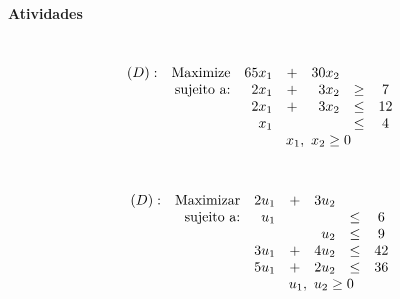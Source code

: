 \documentclass[12pt]{exam}
\begin{document}



\printanswers

\begin{center}
\textbf{{\Huge Atividades}}
\end{center}

\begin{questions}

\question \ \\


	\begin{equation*}	
				\begin{array}{c r r c r c c }
			(D) :&  \text{Maximize}   & 65x_1 & +  & 30x_2 \\
			& \text{sujeito a:} & 2x_1 & + & 3x_2  & \geq & 7 \\
			&                   & 2x_1 & + & 3x_2  & \leq & 12 \\
			&                   &  x_1 &   &       & \leq & 4 \\
			&                   & \multicolumn{5}{c}{x_1,~x_2 \geq 0}
			\end{array}
	\end{equation*}

\question \ \\
	\begin{equation*}	
				\begin{array}{c r r c r c c }
			(D) :&  \text{Maximizar}   & 2u_1 & +  & 3u_2 \\
			& \text{sujeito a:} & u_1   &    &           & \leq   & 6 \\
			&                           &          &    & u_2    & \leq   & 9 \\
			&                           & 3u_1 & + & 4u_2  & \leq  & 42 \\
			&                           & 5u_1 & + &  2u_2 & \leq   &  36 \\			
			&                           & \multicolumn{5}{c}{u_1,~u_2 \geq 0}
			\end{array}
	\end{equation*}


\end{questions}
\end{document}
